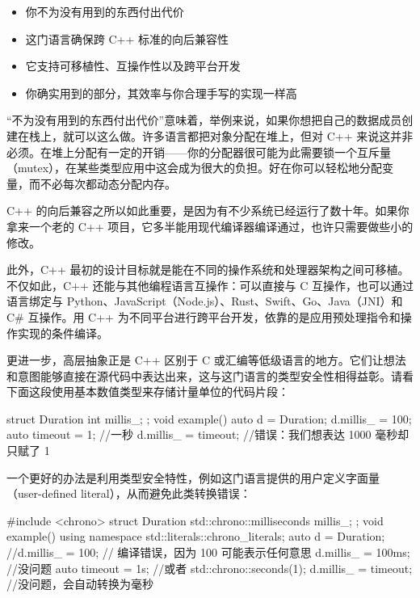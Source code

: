 \begin{itemize}
\item 你不为没有用到的东西付出代价
\item 这门语言确保跨 C++ 标准的向后兼容性
\item 它支持可移植性、互操作性以及跨平台开发
\item 你确实用到的部分，其效率与你合理手写的实现一样高
\end{itemize}

“不为没有用到的东西付出代价”意味着，举例来说，如果你想把自己的数据成员创建在栈上，就可以这么做。许多语言都把对象分配在堆上，但对 C++ 来说这并非必须。在堆上分配有一定的开销——你的分配器很可能为此需要锁一个互斥量（mutex），在某些类型应用中这会成为很大的负担。好在你可以轻松地分配变量，而不必每次都动态分配内存。

C++ 的向后兼容之所以如此重要，是因为有不少系统已经运行了数十年。如果你拿来一个老的 C++ 项目，它多半能用现代编译器编译通过，也许只需要做些小的修改。

此外，C++ 最初的设计目标就是能在不同的操作系统和处理器架构之间可移植。不仅如此，C++ 还能与其他编程语言互操作：可以直接与 C 互操作，也可以通过语言绑定与 Python、JavaScript（Node.js）、Rust、Swift、Go、Java（JNI）和 C\# 互操作。用 C++ 为不同平台进行跨平台开发，依靠的是应用预处理指令和操作实现的条件编译。

\label{idx:029}
更进一步，高层抽象正是 C++ 区别于 C 或汇编等低级语言的地方。它们让想法和意图能够直接在源代码中表达出来，这与这门语言的类型安全性相得益彰。请看下面这段使用基本数值类型来存储计量单位的代码片段：

\begin{codebox}[cpp]
struct Duration {
    int millis_;
};
void example() {
    auto d = Duration{};
    d.millis_ = 100;
    auto timeout = 1; //一秒
    d.millis_ = timeout; //错误：我们想表达 1000 毫秒却只赋了 1
}
\end{codebox}

一个更好的办法是利用类型安全特性，例如这门语言提供的用户定义字面量（user-defined literal），从而避免此类转换错误：

\begin{codebox}[cpp]
#include <chrono>
struct Duration {
    std::chrono::milliseconds millis_;
};
void example() {
    using namespace std::literals::chrono_literals;
    auto d = Duration{};
    //d.millis_ = 100; // 编译错误，因为 100 可能表示任何意思
    d.millis_ = 100ms; //没问题
    auto timeout = 1s; //或者 std::chrono::seconds(1);
    d.millis_ =
        timeout; //没问题，会自动转换为毫秒
}
\end{codebox}


